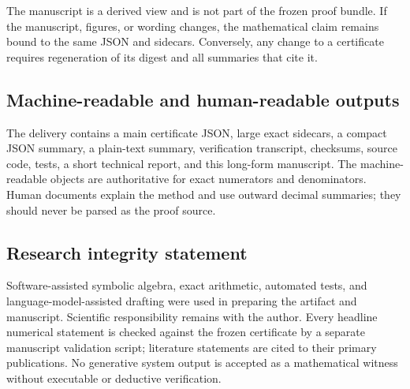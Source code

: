 The manuscript is a derived view and is not part of the frozen proof bundle.
If the manuscript, figures, or wording changes, the mathematical claim remains
bound to the same JSON and sidecars.  Conversely, any change to a certificate
requires regeneration of its digest and all summaries that cite it.

\subsection{Machine-readable and human-readable outputs}

The delivery contains a main certificate JSON, large exact sidecars, a compact
JSON summary, a plain-text summary, verification transcript, checksums, source
code, tests, a short technical report, and this long-form manuscript.  The
machine-readable objects are authoritative for exact numerators and
denominators.  Human documents explain the method and use outward decimal
summaries; they should never be parsed as the proof source.

\subsection{Research integrity statement}

Software-assisted symbolic algebra, exact arithmetic, automated tests, and
language-model-assisted drafting were used in preparing the artifact and
manuscript.  Scientific responsibility remains with the author.  Every
headline numerical statement is checked against the frozen certificate by a
separate manuscript validation script; literature statements are cited to
their primary publications.  No generative system output is accepted as a
mathematical witness without executable or deductive verification.
